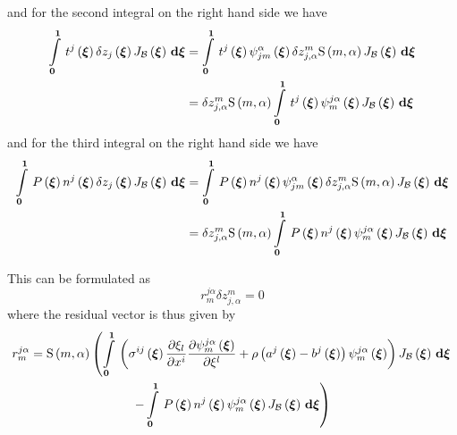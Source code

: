 and for the second integral on the right hand side we have
\begin{equation}
  \begin{split}
    \gint{\vectr{0}}{\vectr{1}}{\fnof{t^{j}}{\vectr{\xi}}\delta
      \fnof{z_{j}}{\vectr{\xi}}\fnof{J_{\embedmanifold{B}}}{\vectr{\xi}}}{\vectr{\xi}}
    &= \gint{\vectr{0}}{\vectr{1}}{\fnof{t^{j}}{\vectr{\xi}}
      \idxgbfn{j}{m}{\alpha}{\vectr{\xi}}\delta
      z_{j,\alpha}^{m}\gsf{m}{\alpha}
      \fnof{J_{\embedmanifold{B}}}{\vectr{\xi}}}{\vectr{\xi}} \\
    &= \delta
    z_{j,\alpha}^{m}\gsf{m}{\alpha}\gint{\vectr{0}}{\vectr{1}}{\fnof{t^{j}}{\vectr{\xi}}\gbfn{m}{j\alpha}{\vectr{\xi}}
      \fnof{J_{\embedmanifold{B}}}{\vectr{\xi}}}{\vectr{\xi}}
  \end{split}
\end{equation}
and for the third integral on the right hand side we have
\begin{equation}
  \begin{split}
    \gint{\vectr{0}}{\vectr{1}}{\fnof{P}{\vectr{\xi}}\fnof{n^{j}}{\vectr{\xi}}\delta
      \fnof{z_{j}}{\vectr{\xi}}\fnof{J_{\embedmanifold{B}}}{\vectr{\xi}}}{\vectr{\xi}}
    &= \gint{\vectr{0}}{\vectr{1}}{\fnof{P}{\vectr{\xi}}\fnof{n^{j}}{\vectr{\xi}}
      \idxgbfn{j}{m}{\alpha}{\vectr{\xi}}\delta
      z_{j,\alpha}^{m}\gsf{m}{\alpha}
      \fnof{J_{\embedmanifold{B}}}{\vectr{\xi}}}{\vectr{\xi}}
    \\
    &= \delta z_{j,\alpha}^{m}\gsf{m}{\alpha}\gint{\vectr{0}}{\vectr{1}}{\fnof{P}{\vectr{\xi}}\fnof{n^{j}}{\vectr{\xi}}
      \gbfn{m}{j\alpha}{\vectr{\xi}}
      \fnof{J_{\embedmanifold{B}}}{\vectr{\xi}}}{\vectr{\xi}}
  \end{split}
\end{equation}

This can be formulated as
\begin{equation}
  r_{m}^{j\alpha}\delta z_{j,\alpha}^{m}=0
\end{equation}
where the residual vector is thus given by
\begin{multline}
  r_{m}^{j\alpha}=\gsf{m}{\alpha}\left(
    \gint{\vectr{0}}{\vectr{1}}{\pbrac{\fnof{\sigma^{ij}}{\vectr{\xi}}\delby{\xi_{l}}{x^{i}}\delby{
          \gbfn{m}{j\alpha}{\vectr{\xi}}}{\xi^{l}}+\rho\pbrac{
        \fnof{a^{j}}{\vectr{\xi}}-\fnof{b^{j}}{\vectr{\xi}}}\gbfn{m}{j\alpha}{\vectr{\xi}}}
      \fnof{J_{\embedmanifold{B}}}{\vectr{\xi}}}{\vectr{\xi}}\right. \\
    \left.-\gint{\vectr{0}}{\vectr{1}}{\fnof{P}{\vectr{\xi}}\fnof{n^{j}}{\vectr{\xi}}
      \gbfn{m}{j\alpha}{\vectr{\xi}}
      \fnof{J_{\embedmanifold{B}}}{\vectr{\xi}}}{\vectr{\xi}}\right)
\end{multline}

